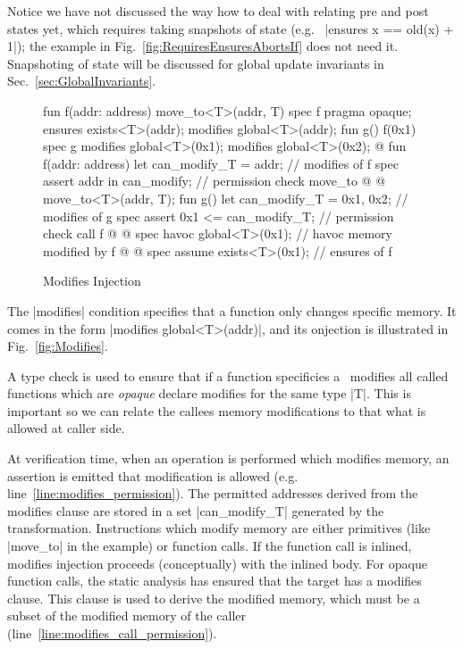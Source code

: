 Notice we have not discussed the way how to deal with relating pre and post
states yet, which requires taking snapshots of state (e.g.~%
|ensures x == old(x) + 1|); the example in
Fig.~\ref{fig:RequiresEnsuresAbortsIf} does not need it. Snapshoting of state
will be discussed for global update invariants in Sec.~\ref{sec:GlobalInvariants}.


\begin{figure}[t!]
  \caption{Modifies Injection}
  \label{fig:Modifies}
  \centering
\begin{MoveBox}
  fun f(addr: address) { move_to<T>(addr, T{}) }
  spec f {
    pragma opaque;
    ensures exists<T>(addr);
    modifies global<T>(addr);
  }
  fun g() { f(0x1) }
  spec g {
    modifies global<T>(0x1); modifies global<T>(0x2);
  }
  @\transform@
  fun f(addr: address) {
    let can_modify_T = {addr};         // modifies of f
    spec assert addr in can_modify;    // permission check move_to @%
                                            \label{line:modifies_permission}@
    move_to<T>(addr, T{});
  }
  fun g() {
    let can_modify_T = {0x1, 0x2};     // modifies of g
    spec assert {0x1} <= can_modify_T; // permission check call f @%
                                            \label{line:modifies_call_permission}@
    spec havoc global<T>(0x1);         // havoc memory modified by f @%
                                            \label{line:modifies_havoc}@
    spec assume exists<T>(0x1);        // ensures of f
  }
\end{MoveBox}
\end{figure}


The |modifies| condition specifies that a function only changes specific memory.
It comes in the form |modifies global<T>(addr)|, and its onjection is
illustrated in Fig.~\ref{fig:Modifies}.

A type check is used to ensure that if a function specificies a~%
modifies all called functions which are \emph{opaque} declare modifies for the
same type |T|. This is important so we can relate the callees memory
modifications to that what is allowed at caller side.

At verification time, when an operation is performed which modifies memory, an
assertion is emitted that modification is allowed
(e.g. line~\ref{line:modifies_permission}). The permitted addresses derived from
the modifies clause are stored in a set |can_modify_T| generated by the
transformation. Instructions which modify memory are either primitives (like
|move_to| in the example) or function calls. If the function call is inlined,
modifies injection proceeds (conceptually) with the inlined body. For opaque
function calls, the static analysis has ensured that the target has a modifies
clause.  This clause is used to derive the modified memory, which must be a
subset of the modified memory of the caller
(line~\ref{line:modifies_call_permission}).


